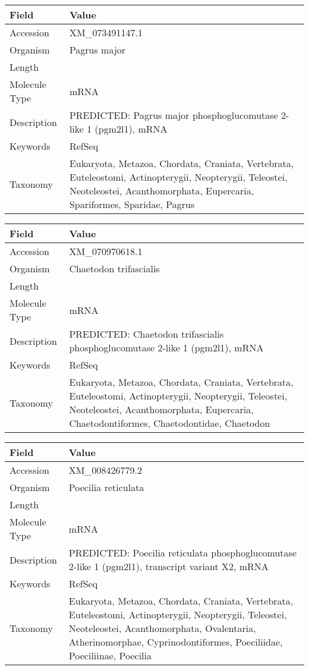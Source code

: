 \documentclass[10pt]{article}
\begin{document}
{\footnotesize
\begin{longtable}{>{\raggedright\arraybackslash}p{4.5cm} >{\raggedright\arraybackslash}p{11.5cm}}
\textbf{Field} & \textbf{Value} \\
\hline
Accession & XM\_073491147.1 \\
Organism & Pagrus major \\
Length & 2995 \\
Molecule Type & mRNA \\
Description & PREDICTED: Pagrus major phosphoglucomutase 2-like 1 (pgm2l1), mRNA \\
Keywords & RefSeq \\
Taxonomy & Eukaryota, Metazoa, Chordata, Craniata, Vertebrata, Euteleostomi, Actinopterygii, Neopterygii, Teleostei, Neoteleostei, Acanthomorphata, Eupercaria, Spariformes, Sparidae, Pagrus \\
\end{longtable}
}

{\footnotesize
\begin{longtable}{>{\raggedright\arraybackslash}p{4.5cm} >{\raggedright\arraybackslash}p{11.5cm}}
\textbf{Field} & \textbf{Value} \\
\hline
Accession & XM\_070970618.1 \\
Organism & Chaetodon trifascialis \\
Length & 3381 \\
Molecule Type & mRNA \\
Description & PREDICTED: Chaetodon trifascialis phosphoglucomutase 2-like 1 (pgm2l1), mRNA \\
Keywords & RefSeq \\
Taxonomy & Eukaryota, Metazoa, Chordata, Craniata, Vertebrata, Euteleostomi, Actinopterygii, Neopterygii, Teleostei, Neoteleostei, Acanthomorphata, Eupercaria, Chaetodontiformes, Chaetodontidae, Chaetodon \\
\end{longtable}
}

{\footnotesize
\begin{longtable}{>{\raggedright\arraybackslash}p{4.5cm} >{\raggedright\arraybackslash}p{11.5cm}}
\textbf{Field} & \textbf{Value} \\
\hline
Accession & XM\_008426779.2 \\
Organism & Poecilia reticulata \\
Length & 3021 \\
Molecule Type & mRNA \\
Description & PREDICTED: Poecilia reticulata phosphoglucomutase 2-like 1 (pgm2l1), transcript variant X2, mRNA \\
Keywords & RefSeq \\
Taxonomy & Eukaryota, Metazoa, Chordata, Craniata, Vertebrata, Euteleostomi, Actinopterygii, Neopterygii, Teleostei, Neoteleostei, Acanthomorphata, Ovalentaria, Atherinomorphae, Cyprinodontiformes, Poeciliidae, Poeciliinae, Poecilia \\
\end{longtable}
}
\end{document}
